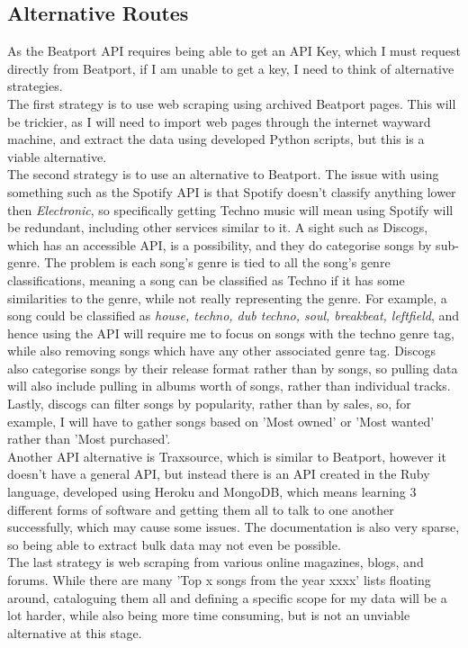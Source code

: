 \documentclass{article}
\begin{document}
\subsection{Alternative Routes}
As the Beatport API requires being able to get an API Key, which I must request directly from Beatport, if I am unable to get a key, I need to think of alternative strategies.\\
The first strategy is to use web scraping using archived Beatport pages. This will be trickier, as I will need to import web pages through the internet wayward machine, and extract the data using developed Python scripts, but this is a viable alternative.\\
The second strategy is to use an alternative to Beatport. The issue with using something such as the Spotify API is that Spotify doesn't classify anything lower then \textit{Electronic}, so specifically getting Techno music will mean using Spotify will be redundant, including other services similar to it. A sight such as Discogs, which has an accessible API, is a possibility, and they do categorise songs by sub-genre. The problem is each song's genre is tied to all the song's genre classifications, meaning a song can be classified as Techno if it has some similarities to the genre, while not really representing the genre. For example, a song could be classified as \textit{house, techno, dub techno, soul, breakbeat, leftfield}, and hence using the API will require me to focus on songs with the techno genre tag, while also removing songs which have any other associated genre tag. Discogs also categorise songs by their release format rather than by songs, so pulling data will also include pulling in albums worth of songs, rather than individual tracks. Lastly, discogs can filter songs by popularity, rather than by sales, so, for example, I will have to gather songs based on 'Most owned' or 'Most wanted' rather than 'Most purchased'.\\
Another API alternative is Traxsource, which is similar to Beatport, however it doesn't have a general API, but instead there is an API created in the Ruby language, developed using Heroku and MongoDB, which means learning 3 different forms of software and getting them all to talk to one another successfully, which may cause some issues. The documentation is also very sparse, so being able to extract bulk data may not even be possible.\\
The last strategy is web scraping from various online magazines, blogs, and forums. While there are many 'Top x songs from the year xxxx' lists floating around, cataloguing them all and defining a specific scope for my data will be a lot harder, while also being more time consuming, but is not an unviable alternative at this stage.
\end{document}
